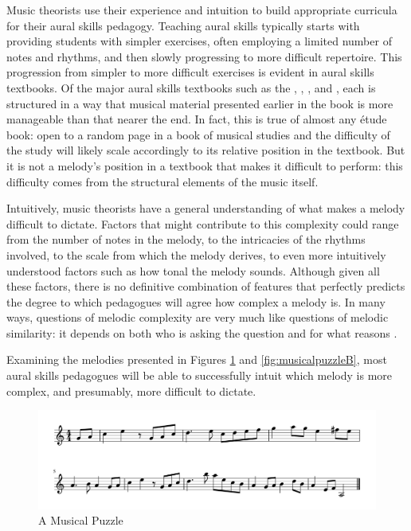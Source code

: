 \documentclass[12pt,]{book}
\begin{document}
Music theorists use their experience and intuition to build appropriate curricula for their aural skills pedagogy.
Teaching aural skills typically starts with providing students with simpler exercises, often employing a limited number of notes and rhythms, and then slowly progressing to more difficult repertoire.
This progression from simpler to more difficult exercises is evident in aural skills textbooks.
Of the major aural skills textbooks such as the \citet{ottmanMusicSightSinging2014}, \citet{berkowitzNewApproachSight2011}, \citet{karpinskiManualEarTraining2007}, and \citet{clelandDevelopingMusicianshipAural2010}, each is structured in a way that musical material presented earlier in the book is more manageable than that nearer the end.
In fact, this is true of almost any étude book: open to a random page in a book of musical studies and the difficulty of the study will likely scale accordingly to its relative position in the textbook.
But it is not a melody's position in a textbook that makes it difficult to perform: this difficulty comes from the structural elements of the music itself.

Intuitively, music theorists have a general understanding of what makes a melody difficult to dictate.
Factors that might contribute to this complexity could range from the number of notes in the melody, to the intricacies of the rhythms involved, to the scale from which the melody derives, to even more intuitively understood factors such as how tonal the melody sounds.
Although given all these factors, there is no definitive combination of features that perfectly predicts the degree to which pedagogues will agree how complex a melody is.
In many ways, questions of melodic complexity are very much like questions of melodic similarity: it depends on both who is asking the question and for what reasons \citep{cambouropoulosHowSimilarSimilar2009}.

Examining the melodies presented in Figures \ref{fig:musicalpuzzleA} and \ref{fig:musicalpuzzleB}, most aural skills pedagogues will be able to successfully intuit which melody is more complex, and presumably, more difficult to dictate.

\begin{figure}

{\centering \includegraphics[width=1\linewidth]{img/musicalpuzzle/MP2/MP_X-1} 

}

\caption{A Musical Puzzle}\label{fig:musicalpuzzleA}
\end{figure}
\end{document}
